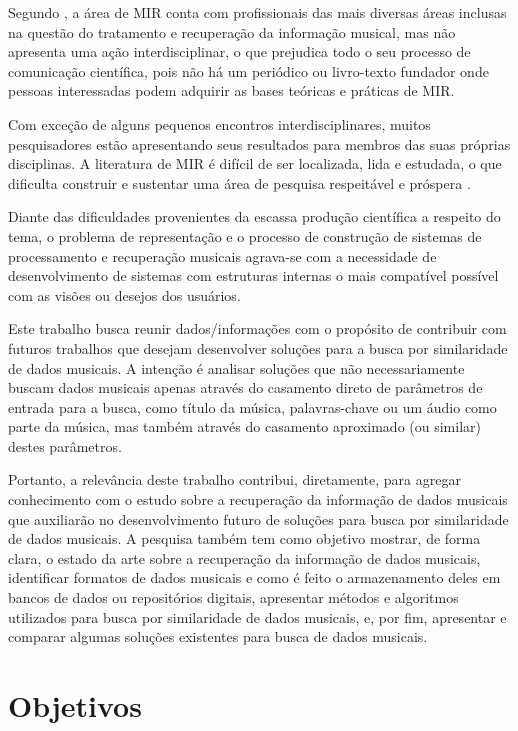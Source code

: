 Segundo , a área de MIR conta com profissionais das mais diversas áreas inclusas na questão do tratamento e recuperação da informação musical, mas não apresenta uma ação interdisciplinar, o que prejudica todo o seu processo de comunicação científica, pois não há um periódico ou livro-texto fundador onde pessoas interessadas podem adquirir as bases teóricas e práticas de MIR. 

Com exceção de alguns pequenos encontros interdisciplinares, muitos pesquisadores estão apresentando seus resultados para membros das suas próprias disciplinas. A literatura de MIR é difícil de ser localizada, lida e estudada, o que dificulta construir e sustentar uma área de pesquisa respeitável e próspera \cite{santini&souza2007}.

Diante das dificuldades provenientes da escassa produção científica a respeito do tema, o problema de representação e o processo de construção de sistemas de processamento e recuperação musicais agrava-se com a necessidade de desenvolvimento de sistemas com estruturas internas o mais compatível possível com as visões ou desejos dos usuários.

Este trabalho busca reunir dados/informações com o propósito de contribuir com futuros trabalhos que desejam desenvolver soluções para a busca por similaridade de dados musicais. A intenção é analisar soluções que não necessariamente buscam dados musicais apenas através do casamento direto de parâmetros de entrada para a busca, como título da música, palavras-chave ou um áudio como parte da música, mas também através do casamento aproximado (ou similar) destes parâmetros.

Portanto, a relevância deste trabalho contribui, diretamente, para agregar conhecimento com o estudo sobre a recuperação da informação de dados musicais que auxiliarão no desenvolvimento futuro de soluções para busca por similaridade de dados musicais. A pesquisa também tem como objetivo mostrar, de forma clara, o estado da arte sobre a recuperação da informação de dados musicais, identificar formatos de dados musicais e como é feito o armazenamento deles em bancos de dados ou repositórios digitais, apresentar métodos e algoritmos utilizados para busca por similaridade de dados musicais, e, por fim, apresentar e comparar algumas soluções existentes para busca de dados musicais.

\section{Objetivos}

